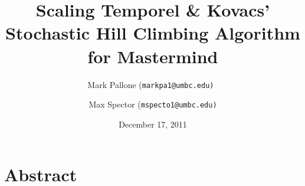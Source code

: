 \documentclass[11pt,twocolumn]{article}
\newcommand{\HRule}{\rule{\linewidth}{0.5mm}}
\begin{document}
\title{Scaling Temporel \& Kovacs' Stochastic Hill Climbing Algorithm for Mastermind}
\date{December 17, 2011}
\author{Mark Pallone (\tt markpa1@umbc.edu\rm) \and Max Spector (\tt mspecto1@umbc.edu\rm)}

\maketitle










\section{Abstract}
\end{document}
